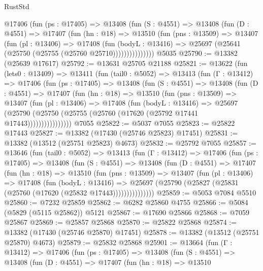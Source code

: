 \begin{lexlean}{RustStd}
\begin{coremodule}
          @17406
            (fun (ps : @17405) =>
            @13408
              (fun (S : @4551) =>
              @13408
                (fun (D : @4551) =>
                @17407
                  (fun (hn : @18) =>
                  @13510
                    (fun (pns : @13509) =>
                    @13407
                      (fun (pl : @13406) =>
                      @17408
                        (fun (bodyL : @13416) =>
                        @25697 (@25641 (@25750 (@25755 (@25760 @25710)))))))))))))))
    @5035
@25790 := @13382 (@25639 @17617)
@25792 := @13631 @25705 @21188
@25821 := @13622
    (fun (lets0 : @13409) =>
    @13411
      (fun (tail0 : @5052) =>
      @13413
        (fun (Γ : @13412) =>
        @17406
          (fun (ps : @17405) =>
          @13408
            (fun (S : @4551) =>
            @13408
              (fun (D : @4551) =>
              @17407
                (fun (hn : @18) =>
                @13510
                  (fun (pns : @13509) =>
                  @13407
                    (fun (pl : @13406) =>
                    @17408
                      (fun (bodyL : @13416) =>
                      @25697
                        (@25790
                          (@25750 (@25755 (@25760 (@17620 (@25792 @17441 @17443))))))))))))))))
    @7055
@25822 := @5037 @7055
@25823 := @25822 @17443
@25827 := @13382 (@17430 (@25746 @25823) @17451)
@25831 := @13382 (@13512 (@25751 @25823) @4673)
@25832 := @25792 @7055
@25857 := @13646
    (fun (tail0 : @5052) =>
    @13413
      (fun (Γ : @13412) =>
      @17406
        (fun (ps : @17405) =>
        @13408
          (fun (S : @4551) =>
          @13408
            (fun (D : @4551) =>
            @17407
              (fun (hn : @18) =>
              @13510
                (fun (pns : @13509) =>
                @13407
                  (fun (pl : @13406) =>
                  @17408
                    (fun (bodyL : @13416) =>
                    @25697 (@25790 (@25827 (@25831 (@25760 (@17620 (@25832 @17443)))))))))))))))
@25859 := @5053 @7084 @5510
@25860 := @7232 @25859
@25862 := @6282 @25860 @4755
@25866 := @5084 (@5829 (@5115 @25862)) @5121
@25867 := @17690 @25866
@25868 := @7059 @25867
@25869 := @25857 @25868
@25870 := @25822 @25868
@25874 := @13382 (@17430 (@25746 @25870) @17451)
@25878 := @13382 (@13512 (@25751 @25870) @4673)
@25879 := @25832 @25868
@25901 := @13664
    (fun (Γ : @13412) =>
    @17406
      (fun (ps : @17405) =>
      @13408
        (fun (S : @4551) =>
        @13408
          (fun (D : @4551) =>
          @17407
            (fun (hn : @18) =>
            @13510

\end{coremodule}
\end{lexlean}
